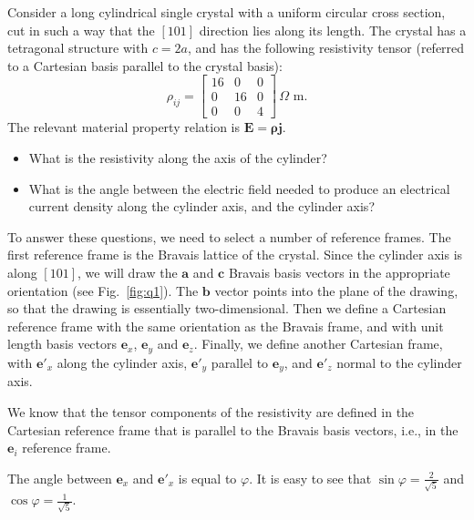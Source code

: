 \begin{example}
Consider a long cylindrical single crystal with a uniform circular cross section, cut in such a way that 
the $[101]$ direction lies along its length.  The crystal has a tetragonal structure with $c=2a$, and has
the following resistivity tensor (referred to a Cartesian basis parallel to the crystal basis):
\[
	\rho_{ij} = \left[\begin{matrix}
	16&0&0\\
	0&16&0\\
	0&0&4\end{matrix}\right]\,\text{$\Omega$ m}.
\]
The relevant material property relation is $\mathbf{E} = \bm{\rho}\mathbf{j}$.
\begin{itemize}
	\item What is the resistivity along the axis of the cylinder?
	\item What is the angle between the electric field needed to produce an electrical current density
	along the cylinder axis, and the cylinder axis?
\end{itemize}

To answer these questions, we need to select a number of reference frames.  The first reference frame
is the Bravais lattice of the crystal.  Since the cylinder axis is along $[101]$, we will draw the $\mathbf{a}$
and $\mathbf{c}$ Bravais basis vectors in the appropriate orientation (see Fig.~\ref{fig:q1}).  The $\mathbf{b}$ vector
points into the plane of the drawing, so that the drawing is essentially two-dimensional.  Then we define
a Cartesian reference frame with the same orientation as the Bravais frame, and with unit length basis vectors
$\mathbf{e}_x$, $\mathbf{e}_y$ and $\mathbf{e}_z$.  Finally, we define another Cartesian frame, with 
$\mathbf{e}'_x$ along the cylinder axis, $\mathbf{e}'_y$ parallel to $\mathbf{e}_y$, and $\mathbf{e}'_z$ normal to the 
cylinder axis.


We know that the tensor components of the resistivity are defined in the Cartesian reference frame that is parallel
to the Bravais basis vectors, i.e., in the $\mathbf{e}_i$ reference frame.

The angle between $\mathbf{e}_x$ and $\mathbf{e}'_x$ is equal to $\varphi$.  It is easy to see that 
$\sin\varphi=\frac{2}{\sqrt{5}}$ and $\cos\varphi=\frac{1}{\sqrt{5}}$.


\end{example}

